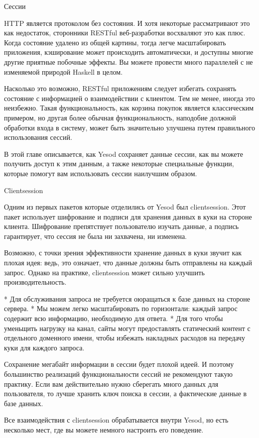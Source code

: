 Сессии

HTTP является протоколом без состояния. И хотя некоторые рассматривают
это как недостаток, сторонники RESTful веб-разработки восхваляют это
как плюс. Когда состояние удалено из общей картины, тогда легче
масштабировать приложения, кэширование может происходить
автоматически, и доступны многие другие приятные побочные эффекты. Вы
можете провести много параллелей с не изменяемой природой Haskell в
целом.

Насколько это возможно, RESTful приложениям следует избегать сохранять
состояние с информацией о взаимодействии с клиентом. Тем не менее,
иногда это неизбежно. Такая функциональность, как корзина покупок
является классическим примером, но другая более обычная
функциональность, наподобие должной обработки входа в систему, может
быть значительно улучшена путем правильного использования сессий.

В этой главе описывается, как Yesod сохраняет данные сессии, как вы
можете получить доступ к этим данным, а также некоторые специальные
функции, которые помогут вам использовать сессии наилучшим образом.

Clientsession

Одним из первых пакетов которые отделились от Yesod был clientsession.
Этот пакет использует шифрование и подписи для хранения данных в куки
на стороне клиента. Шифрование препятствует пользователю изучать
данные, а подпись гарантирует, что сессия не была ни захвачена, ни
изменена.

Возможно, с точки зрения эффективности хранение данных в куки звучит
как плохая идея: ведь, это означает, что данные должны быть отправлены
на каждый запрос. Однако на практике, clientsession может сильно
улучшить производительность.

* Для обслуживания запроса не требуется оюращаться к базе данных на
стороне сервера.
* Мы можем легко масштабировать по горизонтали: каждый запрос содержит
всю информацию, необходимую для ответа.
* Для того чтобы уменьщить нагрузку на канал, сайты могут
предоставлять статический контент с отдельного доменного имени, чтобы
избежать накладных расходов на передачу куки для каждого запроса.

Сохранение мегабайт информации в сессии будет плохой идеей. И поэтому
большинство реализаций функциональности сессий не рекомендуют такую
​практику. Если вам действительно нужно сберегать много данных для
пользователя, то лучше хранить ключ поиска в сессии, а фактические
данные в базе данных.

Все взаимодействия с clientsession обрабатывается внутри Yesod, но
есть несколько мест, где вы можете немного настроить его поведение.

